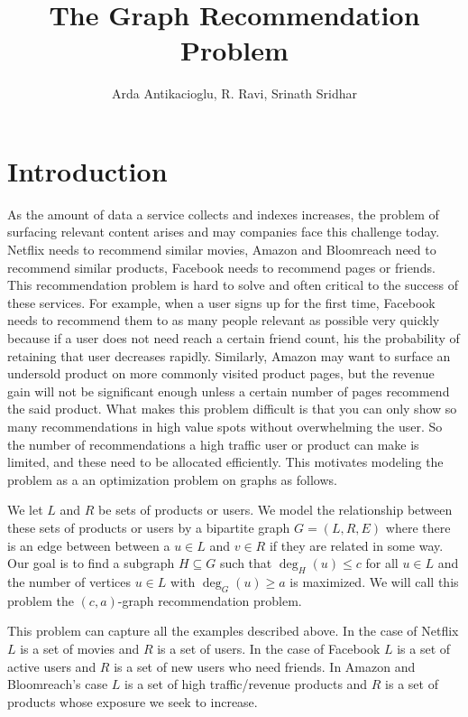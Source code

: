 \documentclass[]{article}
\newcommand{\vs}{\vspace{0.2cm}}
\begin{document}
\title{The Graph Recommendation Problem}
\author{Arda Antikacioglu, R. Ravi, Srinath Sridhar}
\maketitle
\section{Introduction}
As the amount of data a service collects and indexes increases, the
problem of surfacing relevant content arises and may companies face
this challenge today. Netflix needs to recommend similar movies,
Amazon and Bloomreach need to recommend similar products, Facebook
needs to recommend pages or friends. This recommendation problem is
hard to solve and often critical to the success of these services. For
example, when a user signs up for the first time, Facebook needs to
recommend them to as many people relevant as possible very quickly
because if a user does not need reach a certain friend count, his the
probability of retaining that user decreases rapidly. Similarly,
Amazon may want to surface an undersold product on more commonly
visited product pages, but the revenue gain will not be significant
enough unless a certain number of pages recommend the said
product. What makes this problem difficult is that you can only show
so many recommendations in high value spots without overwhelming the
user. So the number of recommendations a high traffic user or product
can make is limited, and these need to be allocated efficiently. This
motivates modeling the problem as a an optimization problem on graphs
as follows. \vs

We let $L$ and $R$ be sets of products or users. We model the
relationship between these sets of products or users by a bipartite
graph $G=(L,R,E)$ where there is an edge between between a $u\in L$
and $v\in R$ if they are related in some way. Our goal is to find
a subgraph $H\subseteq G$ such that $\deg_{H}(u) \leq c$ for all $u\in
L$ and the number of vertices $u\in L$ with $\deg_{G}(u) \geq
a$ is maximized. We will call this problem the $(c,a)$-graph
recommendation problem.\vs

This problem can capture all the examples described above. In the case
of Netflix $L$ is a set of movies and $R$ is a set of users. In the
case of Facebook $L$ is a set of active users and $R$ is a set of new
users who need friends. In Amazon and Bloomreach's case $L$ is a set
of high traffic/revenue products and $R$ is a set of products whose
exposure we seek to increase. \vs
\end{document}
